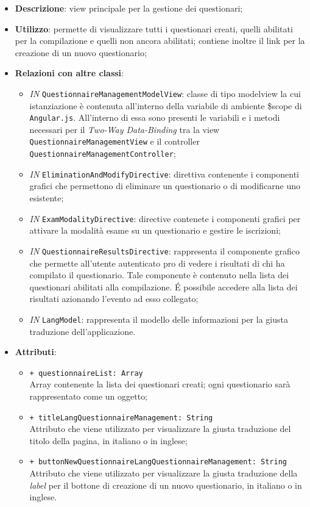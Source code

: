 \begin{itemize}
	\item \textbf{Descrizione}: view principale per la gestione dei questionari;
	\item \textbf{Utilizzo}: permette di visualizzare tutti i questionari creati, quelli abilitati per la compilazione e quelli non ancora abilitati; contiene inoltre il link per la creazione di un nuovo questionario;
	\item \textbf{Relazioni con altre classi}:
	\begin{itemize}
		\item \textit{IN} \texttt{QuestionnaireManagementModelView}: classe di tipo modelview la cui istanziazione è contenuta all'interno della variabile di ambiente \$scope di \texttt{Angular.js}. All'interno di essa sono presenti le variabili e i metodi necessari per il \textit{Two-Way Data-Binding} tra la view \texttt{QuestionnaireManagementView} e il controller \texttt{QuestionnaireManagementController};
		\item \textit{IN} \texttt{EliminationAndModifyDirective}: direttiva contenente i componenti grafici  che permettono di eliminare un questionario o di modificarne uno esistente;
		\item \textit{IN} \texttt{ExamModalityDirective}: directive contenete i componenti grafici per attivare la modalità esame su un questionario e gestire le iscrizioni;
		\item \textit{IN} \texttt{QuestionnaireResultsDirective}: rappresenta il componente grafico che permette all'utente autenticato pro di vedere i risultati di chi ha compilato il questionario. Tale componente è contenuto nella lista dei questionari abilitati alla compilazione. \'E possibile accedere alla lista dei risultati azionando l'evento ad esso collegato;
		\item \textit{IN} \texttt{LangModel}: rappresenta il modello delle informazioni per la giusta traduzione dell'applicazione.
	\end{itemize}
		\item \textbf{Attributi}:
		\begin{itemize}
			\item \texttt{+ questionnaireList: Array} \\ Array contenente la lista dei questionari creati; ogni questionario sarà rappresentato come un oggetto;
			\item \texttt{+ titleLangQuestionnaireManagement: String} \\ Attributo che viene utilizzato per visualizzare la giusta traduzione del titolo della pagina, in italiano o in inglese;
			\item \texttt{+ buttonNewQuestionnaireLangQuestionnaireManagement: String} \\ Attributo che viene utilizzato per visualizzare la giusta traduzione della \textit{label} per il bottone di creazione di un nuovo questionario, in italiano o in inglese.
		\end{itemize}
\end{itemize}
